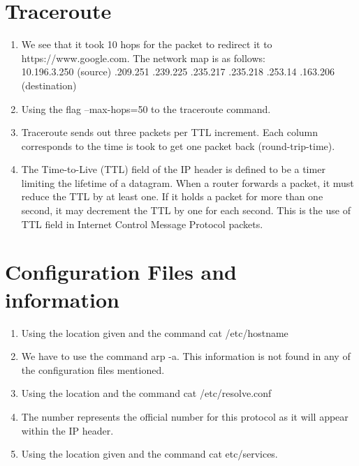 \documentclass[12pt]{article}
\begin{document}
\section{Traceroute}
    \begin{enumerate}[label=(\alph*)]
        \item We see that it took 10 hops for the packet to redirect it to https://www.google.com.
        The network map is as follows: \\
        10.196.3.250 (source) .209.251 .239.225 .235.217 .235.218 .253.14 .163.206 (destination)

        \item Using the flag --max-hops=50 to the traceroute command.
        \item Traceroute sends out three packets per TTL increment. Each column corresponds to the time is took to get one packet back (round-trip-time).
        \item The Time-to-Live (TTL) field of the IP header is defined to be a timer limiting the lifetime of a datagram. When a router forwards a packet, it must reduce the TTL by at least one. If it holds a packet for more than one second, it may decrement the TTL by one for each second.
        This is the use of TTL field in Internet Control Message Protocol packets.
    \end{enumerate}
    
\section{Configuration Files and information}
    \begin{enumerate}[label=(\alph*)]
    \item Using the location given and the command cat /etc/hostname
    \item We have to use the command arp -a. This information is not found in any of the configuration files mentioned.
    \item Using the location and the command cat /etc/resolve.conf
    \item The number represents the official number for this protocol as it will appear within the IP header.
    \item Using the location given and the command cat etc/services.
    \end{enumerate}
\end{document}
